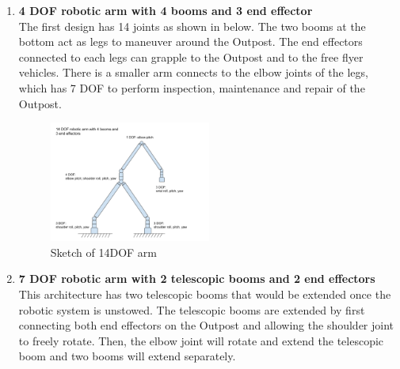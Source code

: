 \documentclass[12pt, letterpaper]{article}
\begin{document}
\begin{enumerate}
\item{\textbf{4 DOF robotic arm with 4 booms and 3 end effector}\\
The first design has 14 joints as shown in  below. The two booms at the bottom act as legs to maneuver around the Outpost. The end effectors connected to each legs can grapple to the Outpost and to the free flyer vehicles. There is a smaller arm connects to the elbow joints of the legs, which has 7 DOF to perform inspection, maintenance and repair of the Outpost.
\begin{figure}[H]
\centering
\includegraphics[width=0.5\textwidth]{14dof}
\caption{Sketch of 14DOF arm}
\label{fig:14dof}
\end{figure}
}
\item{\textbf{7 DOF robotic arm with 2 telescopic booms and 2 end effectors}\\
This architecture has two telescopic booms that would be extended once the robotic system is unstowed. The telescopic booms are extended by first connecting both end effectors on the Outpost and allowing the shoulder joint to freely rotate. Then, the elbow joint will rotate and extend the telescopic boom and two booms will extend separately.

}
\end{enumerate}
\end{document}
